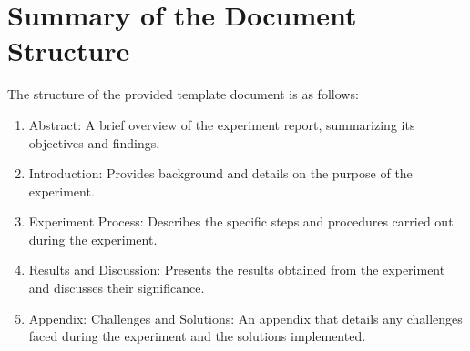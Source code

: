 \documentclass{article}
\begin{document}
\section*{Summary of the Document Structure}

The structure of the provided template document is as follows:

\begin{enumerate}
    \item Abstract: A brief overview of the experiment report, summarizing its objectives and findings.
    \item Introduction: Provides background and details on the purpose of the experiment.
    \item Experiment Process: Describes the specific steps and procedures carried out during the experiment.
    \item Results and Discussion: Presents the results obtained from the experiment and discusses their significance.
    \item Appendix: Challenges and Solutions: An appendix that details any challenges faced during the experiment and the solutions implemented.
\end{enumerate}
\end{document}
